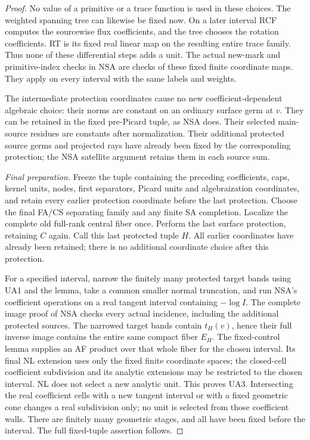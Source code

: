 \begin{proof}
No value of a primitive or a trace function is used in
these choices.  The weighted spanning tree can likewise
be fixed now.  On a later interval RCF computes the
sourcewise flux coefficients, and the tree chooses the
rotation coefficients.  RT is its fixed real linear
map on the resulting entire trace family.  Thus none
of these differential steps adds a unit.  The actual
new-mark and primitive-index checks in NSA are checks
of these fixed finite coordinate maps.  They apply on
every interval with the same labels and weights.

The intermediate protection coordinates cause no new
coefficient-dependent algebraic choice: their norms
are constant on an ordinary surface germ at \(v\).
They can be retained in the fixed pre-Picard tuple,
as NSA does.  Their selected main-source residues are
constants after normalization.  Their additional
protected source germs and projected rays have already
been fixed by the corresponding protection; the NSA
satellite argument retains them in each source sum.

\emph{Final preparation.}
Freeze the tuple containing the preceding coefficients,
caps, kernel units, nodes, first separators, Picard units
and algebraization coordinates, and retain every earlier
protection coordinate before the last protection.
Choose the final FA/CS
separating family and any finite SA completion.  Localize
the complete old full-rank central fiber once.  Perform
the last surface protection, retaining \(C\) again.
Call this last protected tuple \(H\).  All earlier
coordinates have already been retained; there is no
additional coordinate choice after this protection.

For a specified interval, narrow the finitely many
protected target bands using UA1 and the lemma, take
a common smaller normal truncation, and run NSA's
coefficient operations on a real tangent interval
containing \(-\log I\).  The complete image proof of
NSA checks every actual incidence, including the
additional protected sources.  The narrowed target
bands contain \(t_H(v)\), hence their full inverse
image contains the entire same compact fiber \(E_H\).
The fixed-control lemma supplies an AF product over
that whole fiber for the chosen interval.  Its final NL extension
uses only the fixed finite coordinate spaces; the
closed-cell coefficient subdivision and its analytic
extensions may be restricted to the chosen interval.
NL does not select a new analytic unit.  This proves
UA3.  Intersecting the real coefficient cells with a
new tangent interval or with a fixed geometric cone
changes a real subdivision only; no unit is selected
from those coefficient walls.  There are finitely
many geometric stages, and
all have been fixed before the interval.  The full
fixed-tuple assertion follows.
\end{proof}

